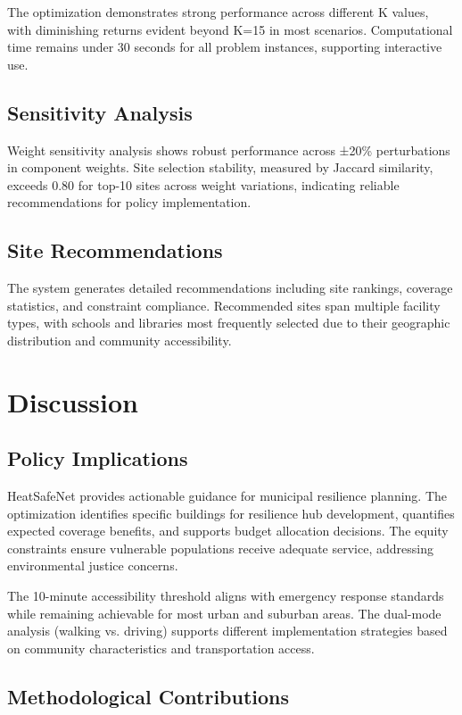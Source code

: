 \documentclass[conference]{IEEEtran}
\begin{document}
The optimization demonstrates strong performance across different K values, with diminishing returns evident beyond K=15 in most scenarios. Computational time remains under 30 seconds for all problem instances, supporting interactive use.

\subsection{Sensitivity Analysis}

Weight sensitivity analysis shows robust performance across ±20\% perturbations in component weights. Site selection stability, measured by Jaccard similarity, exceeds 0.80 for top-10 sites across weight variations, indicating reliable recommendations for policy implementation.

\subsection{Site Recommendations}

The system generates detailed recommendations including site rankings, coverage statistics, and constraint compliance. Recommended sites span multiple facility types, with schools and libraries most frequently selected due to their geographic distribution and community accessibility.

\section{Discussion}

\subsection{Policy Implications}

HeatSafeNet provides actionable guidance for municipal resilience planning. The optimization identifies specific buildings for resilience hub development, quantifies expected coverage benefits, and supports budget allocation decisions. The equity constraints ensure vulnerable populations receive adequate service, addressing environmental justice concerns.

The 10-minute accessibility threshold aligns with emergency response standards while remaining achievable for most urban and suburban areas. The dual-mode analysis (walking vs. driving) supports different implementation strategies based on community characteristics and transportation access.

\subsection{Methodological Contributions}
\end{document}
